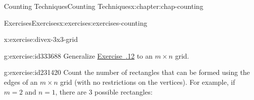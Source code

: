 \documentclass[oneside,10pt,]{book}
\newcommand{\xreffont}{\relax}
\numberwithin{equation}{section}
\begin{document}
\begin{chapterptx}{Counting Techniques}{}{Counting Techniques}{}{}{x:chapter:chap-counting}
\begin{exercises-section}{Exercises}{}{Exercises}{}{}{x:exercises:exercises-counting}
\begin{divisionexercise}{12}{}{}{x:exercise:divex-3x3-grid}
\begin{sidebyside}{3}{0.0916666666666667}{0.0916666666666667}{0.183333333333333}
\begin{sbspanel}{0.15}
{
}%
\end{sbspanel}%
\begin{sbspanel}{0.15}%
%
\end{sbspanel}%
\begin{sbspanel}{0.15}%
%
\end{sbspanel}%
\end{sidebyside}%
\end{divisionexercise}%
\begin{divisionexercise}{13}{}{}{g:exercise:id333688}%
Generalize \hyperlink{x:exercise:divex-3x3-grid}{Exercise~{\xreffont 2.7.12}} to an \(m \times n\) grid.%
\end{divisionexercise}%
\begin{divisionexercise}{14}{}{}{g:exercise:id231420}%
Count the number of rectangles that can be formed using the edges of an \(m \times n\) grid (with no restrictions on the vertices). For example, if \(m = 2\) and \(n = 1\), there are 3 possible rectangles:%
\begin{sidebyside}{3}{0.0916666666666667}{0.0916666666666667}{0.183333333333333}%
\begin{sbspanel}{0.15}%
%
\end{sbspanel}%
\begin{sbspanel}{0.15}%
\end{sbspanel}
\end{sidebyside}
\end{divisionexercise}
\end{exercises-section}
\end{chapterptx}
\end{document}
